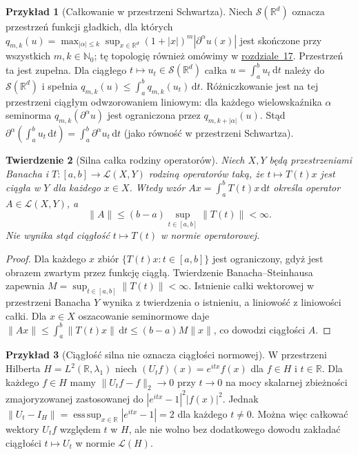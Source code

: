 \documentclass[11pt,a4paper]{article}
\numberwithin{equation}{section}
\theoremstyle{plain}
\newtheorem{twierdzenie}{Twierdzenie}[section]
\theoremstyle{definition}
\newtheorem{przyklad}[twierdzenie]{Przykład}
\theoremstyle{remark}
\newcommand{\R}{\mathbb R}
\newcommand{\N}{\mathbb N}
\begin{document}
\begin{przyklad}[Całkowanie w przestrzeni Schwartza]
\label{ex:schwartz-integral15a}
Niech $\mathcal S(\R^d)$ oznacza przestrzeń funkcji gładkich,
dla których $q_{m,k}(u)=\max_{|\alpha|\le k}\sup_{x\in\R^d}
(1+|x|)^m|\partial^\alpha u(x)|$ jest skończone
przy wszystkich $m,k\in\N_0$; tę topologię również
omówimy w \hyperref[sec:gladkie-schwartz17]{rozdziale~17}. Przestrzeń ta jest zupełna.
Dla ciągłego $t\mapsto u_t\in\mathcal S(\R^d)$ całka
$u=\int_a^b u_t\,\mathrm dt$ należy do $\mathcal S(\R^d)$
i spełnia $q_{m,k}(u)\le\int_a^b q_{m,k}(u_t)\,\mathrm dt$.
Różniczkowanie jest na tej przestrzeni ciągłym
odwzorowaniem liniowym: dla każdego wielowskaźnika $\alpha$
seminorma $q_{m,k}(\partial^\alpha u)$ jest ograniczona
przez $q_{m,k+|\alpha|}(u)$. Stąd
$\partial^\alpha(\int_a^b u_t\,\mathrm dt)
=\int_a^b\partial^\alpha u_t\,\mathrm dt$
(jako równość w przestrzeni Schwartza).
\end{przyklad}

\begin{twierdzenie}[Silna całka rodziny operatorów]
\label{thm:strong-operator-integral15a}
Niech $X,Y$ będą przestrzeniami Banacha i
$T:[a,b]\to\mathcal L(X,Y)$ rodziną operatorów taką, że
$t\mapsto T(t)x$ jest ciągła w $Y$ dla każdego $x\in X$.
Wtedy wzór
$Ax=\int_a^b T(t)x\,\mathrm dt$ określa operator
$A\in\mathcal L(X,Y)$, a
\[
 \|A\|\le(b-a)\sup_{t\in[a,b]}\|T(t)\|<\infty.
\]
Nie wynika stąd ciągłość $t\mapsto T(t)$ w normie operatorowej.
\end{twierdzenie}
\begin{proof}
Dla każdego $x$ zbiór $\{T(t)x:t\in[a,b]\}$ jest ograniczony,
gdyż jest obrazem zwartym przez funkcję ciągłą. Twierdzenie
Banacha--Steinhausa zapewnia
$M=\sup_{t\in[a,b]}\|T(t)\|<\infty$.
Istnienie całki wektorowej w przestrzeni Banacha $Y$
wynika z twierdzenia o istnieniu, a liniowość z
liniowości całki. Dla $x\in X$ oszacowanie seminormowe
daje $\|Ax\|\le\int_a^b\|T(t)x\|\,\mathrm dt
\le(b-a)M\|x\|$, co dowodzi ciągłości $A$.
\end{proof}

\begin{przyklad}[Ciągłość silna nie oznacza ciągłości normowej]
\label{ex:strong-not-norm-cont15a}
W przestrzeni Hilberta $H=L^2(\R,\lambda_1)$ niech
$(U_t f)(x)=e^{itx}f(x)$ dla $f\in H$ i $t\in\R$.
Dla każdego $f\in H$ mamy $\|U_tf-f\|_2\to0$ przy
$t\to0$ na mocy skalarnej zbieżności zmajoryzowanej zastosowanej
do $|e^{itx}-1|^2|f(x)|^2$.
Jednak $\|U_t-I_H\|=\operatorname*{ess\,sup}_{x\in\R}
|e^{itx}-1|=2$ dla każdego $t\ne0$.
Można więc całkować wektory $U_tf$ względem $t$ w $H$,
ale nie wolno bez dodatkowego dowodu zakładać ciągłości
$t\mapsto U_t$ w normie $\mathcal L(H)$.
\end{przyklad}
\end{document}
